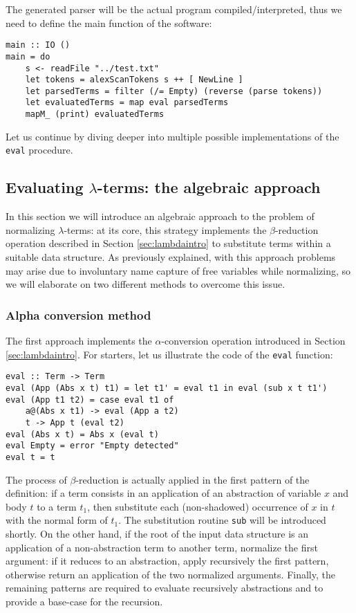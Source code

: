 \documentclass{article}
\begin{document}
The generated parser will be the actual program compiled/interpreted, thus we need to define the main function of the software:

\begin{lstlisting}
main :: IO ()
main = do
    s <- readFile "../test.txt"
    let tokens = alexScanTokens s ++ [ NewLine ]
    let parsedTerms = filter (/= Empty) (reverse (parse tokens))
    let evaluatedTerms = map eval parsedTerms
    mapM_ (print) evaluatedTerms
\end{lstlisting}

Let us continue by diving deeper into multiple possible implementations of the \lstinline|eval| procedure.

\subsection{Evaluating $\lambda$-terms: the algebraic approach} \label{sec:algebraic}

In this section we will introduce an algebraic approach to the problem of normalizing $\lambda$-terms: at its core, this strategy implements the $\beta$-reduction operation described in Section \ref{sec:lambdaintro} to substitute terms within a suitable data structure. As previously explained, with this approach problems may arise due to involuntary name capture of free variables while normalizing, so we will elaborate on two different methods to overcome this issue.

\subsubsection{Alpha conversion method}

The first approach implements the $\alpha$-conversion operation introduced in Section \ref{sec:lambdaintro}. For starters, let us illustrate the code of the \lstinline|eval| function:

\begin{lstlisting}
eval :: Term -> Term
eval (App (Abs x t) t1) = let t1' = eval t1 in eval (sub x t t1')
eval (App t1 t2) = case eval t1 of
    a@(Abs x t1) -> eval (App a t2)
    t -> App t (eval t2)
eval (Abs x t) = Abs x (eval t)
eval Empty = error "Empty detected"
eval t = t
\end{lstlisting}

The process of $\beta$-reduction is actually applied in the first pattern of the definition: if a term consists in an application of an abstraction of variable $x$ and body $t$ to a term $t_1$, then substitute each (non-shadowed) occurrence of $x$ in $t$ with the normal form of $t_1$. The substitution routine \lstinline|sub| will be introduced shortly. On the other hand, if the root of the input data structure is an application of a non-abstraction term to another term, normalize the first argument: if it reduces to an abstraction, apply recursively the first pattern, otherwise return an application of the two normalized arguments. Finally, the remaining patterns are required to evaluate recursively abstractions and to provide a base-case for the recursion.
\end{document}
